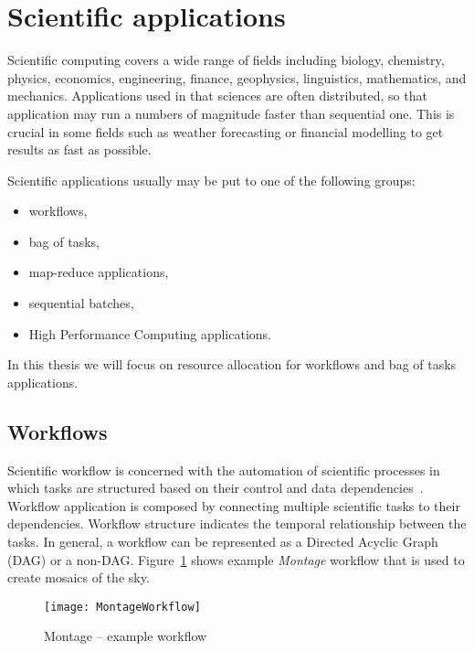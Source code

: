\section{Scientific applications}
\label{intro:application}

Scientific computing covers a wide range of fields including biology, chemistry, physics, economics, engineering, finance, geophysics, linguistics, mathematics, and mechanics. Applications used in that sciences are often distributed, so that application may run a numbers of magnitude faster than sequential one. This is crucial in some fields such as weather forecasting or financial modelling to get results as fast as possible. 

Scientific applications usually may be put to one of the following groups: 
\begin{itemize}
  \item workflows,
  \item bag of tasks,
  \item map-reduce applications,  
  \item sequential batches,
  \item High Performance Computing applications.
\end{itemize}

In this thesis we will focus on resource allocation for workflows and bag of tasks applications.

\subsection{Workflows}
\label{intro:workflow}

Scientific workflow is concerned with the automation of scientific processes in which tasks are structured based on their control and data dependencies~\cite{Taylor:2006:WES:1196459}. Workflow application is composed by connecting multiple scientific tasks to their dependencies. Workflow structure indicates the temporal relationship between the tasks. In general, a workflow can be represented as a Directed Acyclic Graph (DAG) or a non-DAG. Figure~\ref{fig:intro:workflow} shows example \emph{Montage} workflow that is used to create mosaics of the sky.

\begin{figure}[tb]
   \centering
   \texttt{[image: MontageWorkflow]}  
   \caption{Montage – example workflow~\cite{Bharathi08}}
   \label{fig:intro:workflow}
\end{figure} 


